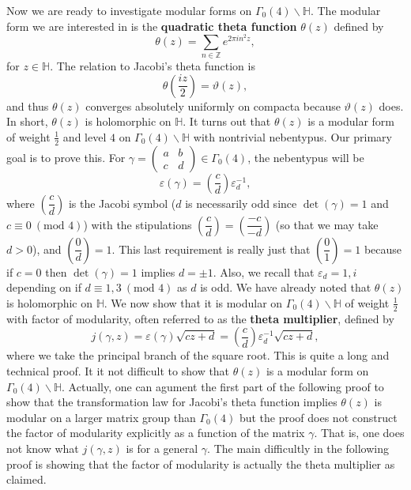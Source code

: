 \documentclass[12pt]{book}
\theoremstyle{definition}\newframedtheorem{method}{Method}
\newcommand{\legendre}[2]{\genfrac{(}{)}{0.5pt}{0}{#1}{#2}}
\newcommand{\tmod}[1]{\ \left(\text{mod }#1\right)}
\newcommand{\Z}{\mathbb{Z}}
\renewcommand{\H}{\mathbb{H}}
\newcommand{\g}{\gamma}
\renewcommand{\t}{\theta}
\newcommand{\G}{\Gamma}
\newcommand{\e}{\varepsilon}
\newcommand{\vt}{\vartheta}
\newcommand{\<}{\langle}
\renewcommand{\>}{\rangle}
\begin{document}
    Now we are ready to investigate modular forms on $\G_{0}(4)\backslash\H$. The modular form we are interested in is the \textbf{quadratic theta function} $\t(z)$ defined by
    \[
        \t(z) = \sum_{n \in \Z}e^{2\pi in^{2}z},
    \]
    for $z \in \H$. The relation to Jacobi's theta function is
    \begin{equation}\label{equ:Jacobi_theta_relation}
        \t\left(\frac{iz}{2}\right) = \vt(z),
    \end{equation}
    and thus $\t(z)$ converges absolutely uniformly on compacta because $\vt(z)$ does. In short, $\t(z)$ is holomorphic on $\H$. It turns out that $\t(z)$ is a modular form of weight $\frac{1}{2}$ and level $4$ on $\G_{0}(4)\backslash\H$ with nontrivial nebentypus. Our primary goal is to prove this. For $\g = \begin{pmatrix} a & b \\ c & d \end{pmatrix} \in \G_{0}(4)$, the nebentypus will be
    \[
        \e(\g) = \legendre{c}{d}\e_{d}^{-1},
    \]
    where $\legendre{c}{d}$ is the Jacobi symbol ($d$ is necessarily odd since $\det(\g) = 1$ and $c \equiv 0 \tmod{4}$) with the stipulations $\legendre{c}{d} = \legendre{-c}{-d}$ (so that we may take $d > 0$), and $\legendre{0}{d} = 1$. This last requirement is really just that $\legendre{0}{1} = 1$ because if $c = 0$ then $\det(\g) = 1$ implies $d = \pm 1$. Also, we recall that $\e_{d} = 1,i$ depending on if $d \equiv 1,3 \tmod{4}$ as $d$ is odd. We have already noted that $\t(z)$ is holomorphic on $\H$. We now show that it is modular on $\G_{0}(4)\backslash\H$ of weight $\frac{1}{2}$ with factor of modularity, often referred to as the \textbf{theta multiplier}, defined by
    \[
        j(\g,z) = \e(\g)\sqrt{cz+d} = \legendre{c}{d}\e_{d}^{-1}\sqrt{cz+d},
    \]
    where we take the principal branch of the square root. This is quite a long and technical proof. It it not difficult to show that $\t(z)$ is a modular form on $\G_{0}(4)\backslash\H$. Actually, one can agument the first part of the following proof to show that the transformation law for Jacobi's theta function implies $\t(z)$ is modular on a larger matrix group than $\G_{0}(4)$ but the proof does not construct the factor of modularity explicitly as a function of the matrix $\g$. That is, one does not know what $j(\g,z)$ is for a general $\g$. The main difficultly in the following proof is showing that the factor of modularity is actually the theta multiplier as claimed.
\end{document}
